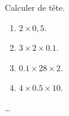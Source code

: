 \begin{exercice*}
   Calculer de tête.
   \begin{multicols}{2}
      \begin{enumerate}
         \item $2\times0,5$.
         \item $3\times2\times\num{0.1}$.
         \item $\num{0.1}\times28\times2$.
         \item $4\times\num{0.5}\times10$.
      \end{enumerate}
   \end{multicols}
\end{exercice*}
\begin{corrige}
   \dots
\end{corrige}
